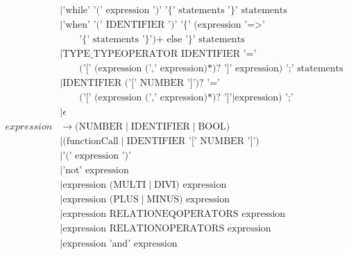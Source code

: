 \begin{align*}
                            & \mid \text{'while' '(' expression ')' '\{' statements '\}' statements}              \\
                            & \mid \text{'when' '(' IDENTIFIER ')' '\{' (expression '=>'}                         \\
                            & \qquad \text{'\{' statements '\}')+ else '\}' statements}                           \\
                            & \mid \text{TYPE\_TYPEOPERATOR IDENTIFIER '='}                                       \\                                      
                            & \qquad \text{('[' (expression (',' expression)*)? ']' expression) ';' statements}   \\
                            & \mid \text{IDENTIFIER ('[' NUMBER ']')? '='}                                        \\
                            & \qquad \text{('[' (expression (',' expression)*)? ']'} \mid  \text{expression) ';'} \\
                            & \mid \epsilon                                                                       \\
    expression              & \to \text{(NUMBER} \mid \text{IDENTIFIER} \mid \text{BOOL)}                         \\
                            & \mid \text{(functionCall} \mid \text{IDENTIFIER '[' NUMBER ']')}                    \\
                            & \mid \text{'(' expression ')'}                                                      \\
                            & \mid \text{'not' expression}                                                        \\
                            & \mid \text{expression (MULTI} \mid \text{DIVI) expression}                          \\
                            & \mid \text{expression (PLUS} \mid \text{MINUS) expression}                          \\
                            & \mid \text{expression RELATIONEQOPERATORS expression}                               \\
                            & \mid \text{expression RELATIONOPERATORS expression}                                 \\
                            & \mid \text{expression 'and' expression}                                             \\

\end{align*}
